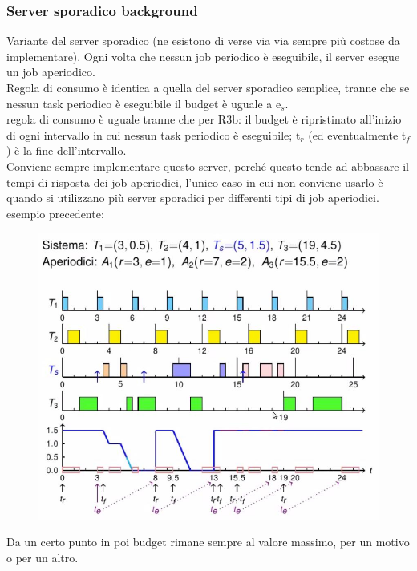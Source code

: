 \documentclass[12pt, oneside]{extbook}
\begin{document}
\subsubsection{Server sporadico background}
Variante del server sporadico (ne esistono di verse via via sempre più costose da implementare). Ogni volta che nessun job periodico è eseguibile, il server esegue un job aperiodico.\\ Regola di consumo è identica a quella del server sporadico semplice, tranne che se nessun task periodico è eseguibile il budget è uguale a e$_{s}$. \\ regola di consumo è uguale tranne che per R3b: il budget è ripristinato all'inizio di ogni intervallo in cui nessun task periodico è eseguibile; t$_{r}$ (ed eventualmente t$_{f}$) è la fine dell'intervallo.\\ Conviene sempre implementare questo server, perché questo tende ad abbassare il tempi di risposta dei job aperiodici, l'unico caso in cui non conviene usarlo è quando si utilizzano più server sporadici per differenti tipi di job aperiodici.\\ esempio precedente:\\
\begin{figure}[!h]
\centering
\includegraphics[scale=0.4]{immagini/image-017.jpg}
\end{figure} 
Da un certo punto in poi budget rimane sempre al valore massimo, per un motivo o per un altro.
\end{document}
